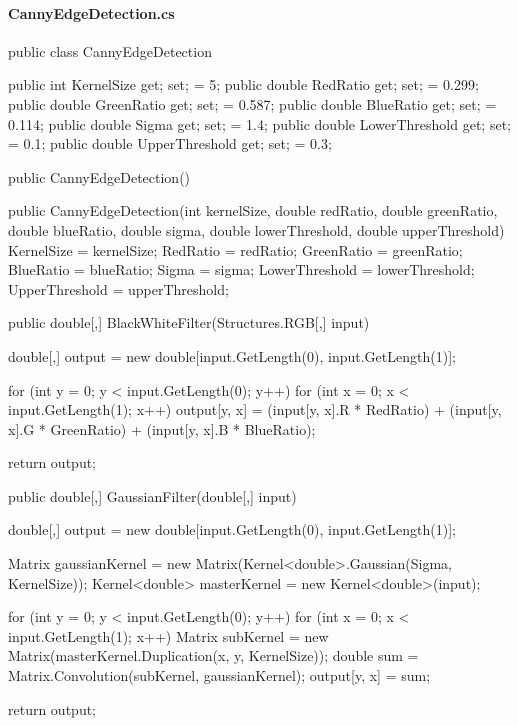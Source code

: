 \begin{flushleft}
    
    \paragraph{CannyEdgeDetection.cs}
    \begin{cscode}
public class CannyEdgeDetection
{
    public int KernelSize { get; set; } = 5;
    public double RedRatio { get; set; } = 0.299;
    public double GreenRatio { get; set; } = 0.587;
    public double BlueRatio { get; set; } = 0.114;
    public double Sigma { get; set; } = 1.4;
    public double LowerThreshold { get; set; } = 0.1;
    public double UpperThreshold { get; set; } = 0.3;

    public CannyEdgeDetection() { }

    public CannyEdgeDetection(int kernelSize, double redRatio, double greenRatio, double blueRatio, double sigma, double lowerThreshold, double upperThreshold)
    {
        KernelSize = kernelSize;
        RedRatio = redRatio;
        GreenRatio = greenRatio;
        BlueRatio = blueRatio;
        Sigma = sigma;
        LowerThreshold = lowerThreshold;
        UpperThreshold = upperThreshold;
    }

    public double[,] BlackWhiteFilter(Structures.RGB[,] input)
    {
        double[,] output = new double[input.GetLength(0), input.GetLength(1)];

        for (int y = 0; y < input.GetLength(0); y++)
        {
            for (int x = 0; x < input.GetLength(1); x++)
            {
                output[y, x] = (input[y, x].R * RedRatio) + (input[y, x].G * GreenRatio) + (input[y, x].B * BlueRatio);
            }
        }

        return output;
    }

    public double[,] GaussianFilter(double[,] input)
    {
        double[,] output = new double[input.GetLength(0), input.GetLength(1)];

        Matrix gaussianKernel = new Matrix(Kernel<double>.Gaussian(Sigma, KernelSize));
        Kernel<double> masterKernel = new Kernel<double>(input);

        for (int y = 0; y < input.GetLength(0); y++)
        {
            for (int x = 0; x < input.GetLength(1); x++)
            {
                Matrix subKernel = new Matrix(masterKernel.Duplication(x, y, KernelSize));
                double sum = Matrix.Convolution(subKernel, gaussianKernel);
                output[y, x] = sum;
            }
        }

        return output;
    }

}
\end{cscode}
\end{flushleft}
